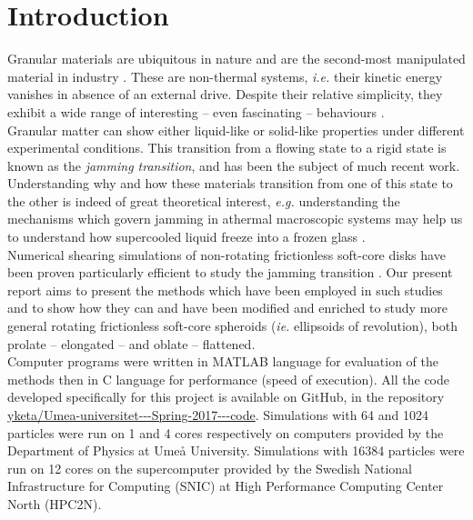 \documentclass[class=report, float=false, crop=false]{standalone}
\begin{document}
\chapter*{Introduction}
\label{introduction}

Granular materials are ubiquitous in nature and are the second-most manipulated material in industry \cite{patrick2005slow}. These are non-thermal systems, \textit{i.e.} their kinetic energy vanishes in absence of an external drive. Despite their relative simplicity, they exhibit a wide range of interesting -- even fascinating -- behaviours \cite{youtube4}.\\

Granular matter can show either liquid-like or solid-like properties under different experimental conditions. This transition from a flowing state to a rigid state is known as the \textit{jamming transition}, and has been the subject of much recent work. Understanding why and how these materials transition from one of this state to the other is indeed of great theoretical interest, \textit{e.g.} understanding the mechanisms which govern jamming in athermal macroscopic systems may help us to understand how supercooled liquid freeze into a frozen glass \cite{liu1998nonlinear}.\\

Numerical shearing simulations of non-rotating frictionless soft-core disks have been proven particularly efficient to study the jamming transition \cite{PRL99.178001,PRE83.031307}. Our present report aims to present the methods which have been employed in such studies and to show how they can and have been modified and enriched to study more general rotating frictionless soft-core spheroids (\textit{ie.} ellipsoids of revolution), both prolate -- elongated -- and oblate -- flattened.\\

Computer programs were written in MATLAB language for evaluation of the methods then in C language for performance (speed of execution). All the code developed specifically for this project is available on GitHub, in the repository \href{https://github.com/yketa/Umea-universitet---Spring-2017---code}{yketa/Umea-universitet-{}-{}-Spring-2017-{}-{}-code}. Simulations with 64 and 1024 particles were run on 1 and 4 cores respectively on computers provided by the Department of Physics at Umeå University. Simulations with 16384 particles were run on 12 cores on the supercomputer provided by the Swedish National Infrastructure for Computing (SNIC) at High Performance Computing Center North (HPC2N).\\
\end{document}
